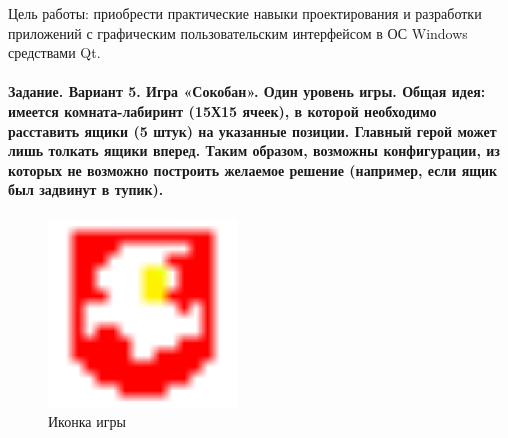 Цель работы:
приобрести практические навыки проектирования и разработки приложений с графическим пользовательским интерфейсом в ОС Windows средствами Qt.

\paragraph{
    Задание.
    Вариант 5.
    Игра «Сокобан». Один уровень игры.
    Общая идея: имеется комната-лабиринт (15Х15 ячеек),
    в которой необходимо расставить ящики (5 штук) на указанные позиции.
    Главный герой может лишь толкать ящики вперед.
    Таким образом, возможны конфигурации, из которых не возможно построить желаемое решение
    (например, если ящик был задвинут в тупик).
} \hspace{0pt}

\begin{figure}[h]
    \centering
    \includegraphics[width=5cm]
    {../../src/QtSokoban/_pics/favicon.png}
    \caption{Иконка игры}
\end{figure}

